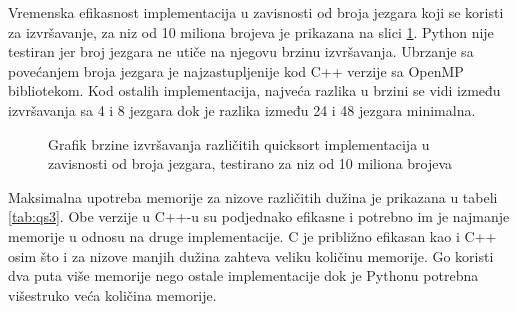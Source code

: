 \documentclass[12pt,oneside]{memoir}
\begin{document}
Vremenska efikasnost implementacija u zavisnosti od broja jezgara koji se koristi za izvršavanje, za niz od 10 miliona brojeva je prikazana na slici \ref{fig:qs1}. Python nije testiran jer broj jezgara ne utiče na njegovu brzinu izvršavanja. Ubrzanje sa povećanjem broja jezgara je najzastupljenije kod C++ verzije sa OpenMP bibliotekom. Kod ostalih implementacija, najveća razlika u brzini se vidi između izvršavanja sa 4 i 8 jezgara dok je razlika između 24 i 48 jezgara minimalna. 
\\

\begin{figure}
\begin{center}


\caption{Grafik brzine izvršavanja različitih quicksort implementacija u zavisnosti od broja jezgara, testirano za niz od 10 miliona brojeva}
\label{fig:qs1}
\end{center}
\end{figure}

Maksimalna upotreba memorije za nizove različitih dužina je prikazana u tabeli \ref{tab:qs3}. Obe verzije u C++-u su podjednako efikasne i potrebno im je najmanje memorije u odnosu na druge implementacije. C je približno efikasan kao i C++ osim što i za nizove manjih dužina zahteva veliku količinu memorije. Go koristi dva puta više memorije nego ostale implementacije dok je Pythonu potrebna višestruko veća količina memorije.
\\
\end{document}
